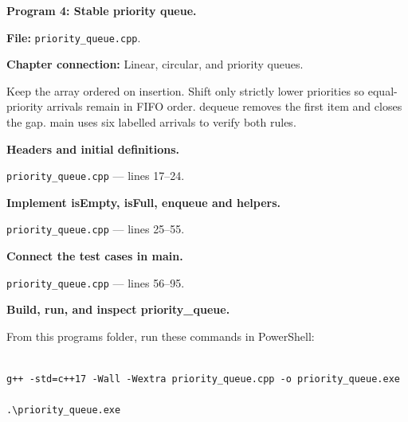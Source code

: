 \textbf{Program 4: Stable priority queue.}

\textbf{File:} \texttt{priority\_queue.cpp}.

\textbf{Chapter connection:} Linear, circular, and priority queues.

Keep the array ordered on insertion. Shift only strictly lower priorities so equal-priority arrivals remain in FIFO order. dequeue removes the first item and closes the gap. main uses six labelled arrivals to verify both rules.



\begin{utpsteps}\setcounter{enumi}{0}\item \textbf{Headers and initial definitions.}\end{utpsteps}

\texttt{priority\_queue.cpp} --- lines 17--24.




\tcbbreak

\begin{utpsteps}\setcounter{enumi}{1}\item \textbf{Implement isEmpty, isFull, enqueue and helpers.}\end{utpsteps}

\texttt{priority\_queue.cpp} --- lines 25--55.






\tcbbreak

\begin{utpsteps}\setcounter{enumi}{2}\item \textbf{Connect the test cases in main.}\end{utpsteps}

\texttt{priority\_queue.cpp} --- lines 56--95.




\tcbbreak

\textbf{Build, run, and inspect priority\_queue.}

From this program\textquotesingle s folder, run these commands in PowerShell:

\begin{lstlisting}[style=utpterminal,language={}]

g++ -std=c++17 -Wall -Wextra priority_queue.cpp -o priority_queue.exe

.\priority_queue.exe

\end{lstlisting}

